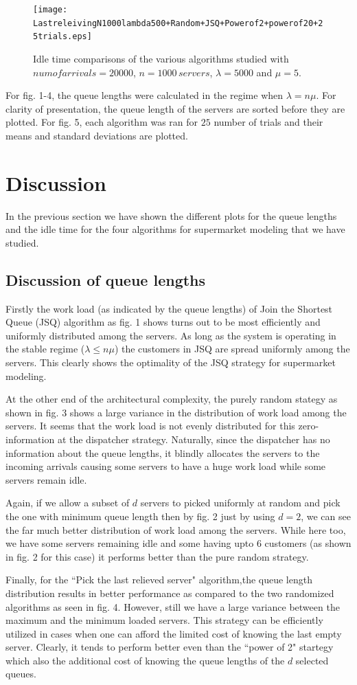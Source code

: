 \documentclass[a4paper,english,11pt]{article}
\begin{document}
\begin{figure}[H]
\centering
\texttt{[image: LastreleivingN1000lambda500+Random+JSQ+Powerof2+powerof20+25trials.eps]}
\caption{Idle time comparisons of the various algorithms studied with $num of arrivals = 20000$, $n = 1000 \, servers$, $\lambda = 5000$ and $\mu = 5$.} 
\end{figure}
For fig. 1-4, the queue lengths were calculated in the regime when $\lambda = n\mu$.  For clarity of presentation, the queue length of the servers are sorted before they are plotted. For fig. 5, each algorithm was ran for $25$ number of trials and their means and standard deviations are plotted. 
\section{Discussion}
In the previous section we have shown the different plots for the queue lengths and the idle time for the four algorithms for supermarket modeling that we have studied.
\subsection{Discussion of queue lengths}
\par Firstly the work load (as indicated by the queue lengths) of Join the Shortest Queue (JSQ) algorithm as fig. 1 shows turns out to be most efficiently and uniformly distributed among the servers. As long as the system is operating in the stable regime ($\lambda \leq n\mu$) the customers in JSQ are spread uniformly among the servers. This clearly shows the optimality of the JSQ strategy for supermarket modeling.
\par At the other end of the architectural complexity, the purely random stategy as shown in fig. 3 shows a large variance in the distribution of work load among the servers. It seems that the work load is not evenly distributed for this zero-information at the dispatcher strategy. Naturally, since the dispatcher has no information about the queue lengths, it blindly allocates the servers to the incoming arrivals causing some servers to have a huge work load while some servers remain idle.
\par Again, if we allow a subset of $d$ servers to picked uniformly at random and pick the one with minimum queue length then by fig. 2 just by using $d=2$, we can see the far much better distribution of work load among the servers. While here too, we have some servers remaining idle and some having upto 6 customers (as shown in fig. 2 for this case) it performs better than the pure random strategy.
\par Finally, for the ``Pick the last relieved server" algorithm,the queue length distribution results in better performance as compared to the two randomized algorithms as seen in fig. 4. However, still we have a large variance between the maximum and the minimum loaded servers. This strategy can be efficiently utilized in cases when one can afford the limited cost of knowing the last empty server. Clearly, it tends to perform better even than the ``power of 2" startegy which also the additional cost of knowing the queue lengths of the $d$ selected queues.
\end{document}
